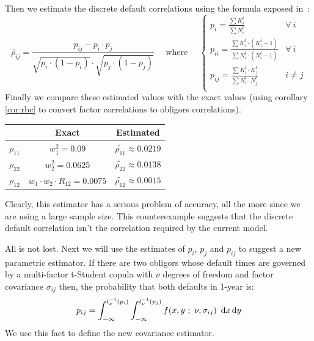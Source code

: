\documentclass[11pt,fleqn]{book} %
\begin{document}
Then we estimate the discrete default correlations using the formula exposed 
in~\cite{nagpal:2001}:
\begin{displaymath}
	\widetilde{\rho_{ij}} = \frac{p_{ij} - p_i \cdot p_j}{\sqrt{p_i \cdot (1-p_i)} \cdot \sqrt{p_j \cdot (1-p_j)}}
	\quad \text{ where } \quad
	\left\{
		\begin{array}{ll}
			p_i = \frac{\sum K_i^t}{\sum N_i^t} & \forall\ i \\
			p_{ii} = \frac{\sum K_i^t \cdot (K_i^t-1)}{\sum N_i^t \cdot (N_i^t-1)} & \forall\ i \\
			p_{ij} = \frac{\sum K_i^t \cdot K_j^t}{\sum N_i^t \cdot N_j^t} & i \ne j \\
		\end{array}
	\right.
\end{displaymath}
Finally we compare these estimated values with the exact values (using 
corollary \ref{cor:rbc} to convert factor correlations to obligors 
correlations). 

\hspace*{1cm}
\begin{tabular}{c|c|c|}
	\cline{2-3}
	& Exact & Estimated \\
	\hline
	\multicolumn{1}{|c|}{$\rho_{11}$} & $w_1^2 = 0.09$ & $\widetilde{\rho_{11}} \approx 0.0219$ \\
	\hline
	\multicolumn{1}{|c|}{$\rho_{22}$} & $w_2^2 = 0.0625$ & $\widetilde{\rho_{22}} \approx 0.0138$ \\
	\hline
	\multicolumn{1}{|c|}{$\rho_{12}$} & $w_1 \cdot w_2 \cdot R_{12} = 0.0075$ & $\widetilde{\rho_{12}} \approx 0.0015$ \\
	\hline
\end{tabular}

Clearly, this estimator has a serious problem of accuracy, all the more since 
we are using a large sample size. This counterexample suggests that the discrete 
default correlation isn't the correlation required by the current model.

All is not lost. Next we will use the estimates of $p_i$, $p_j$ and $p_{ij}$ 
to suggest a new parametric estimator. If there are two obligors whose default
times are governed by a multi-factor t-Student copula with $\nu$ degrees of 
freedom and factor covariance $\sigma_{ij}$ then, the probability that both 
defaults in 1-year is:
\begin{displaymath}
	p_{ij} = \displaystyle \int_{-\infty}^{t_{\nu}^{-1}(p_i)} \int_{-\infty}^{t_{\nu}^{-1}(p_j)} 
	f(x,y\ ;\ \nu, \sigma_{ij})\ \mathop{\mathrm{{}d}}\mathopen{} x \mathop{\mathrm{{}d}}\mathopen{} y
\end{displaymath}
We use this fact to define the new covariance estimator.
\end{document}
